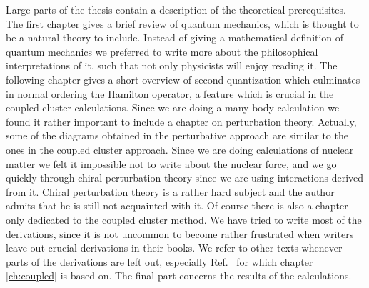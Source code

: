 Large parts  of the thesis contain a description of the theoretical
prerequisites. The first chapter gives a brief review of quantum mechanics, 
which is thought to be a natural theory to include. Instead of giving a mathematical
definition of quantum mechanics we preferred to write more about the
philosophical interpretations of it, such that not only physicists will enjoy
reading it. The following chapter gives a short overview of second
quantization which culminates in normal ordering the Hamilton operator, a feature  which is
crucial in the coupled cluster calculations.  Since we are doing  a many-body
calculation we found it rather important to include a chapter on perturbation
theory. Actually, some of the diagrams obtained in the perturbative approach are
similar to the ones in the coupled cluster approach. Since we are doing calculations
of nuclear matter we felt it impossible not to write about the nuclear force,
and we go quickly through chiral perturbation theory since we are 
using interactions derived from it. Chiral perturbation theory is a rather hard 
subject and the author admits that he is still not acquainted with it. Of course there is also a chapter only dedicated to
the coupled cluster method. We have tried to write most of the derivations, 
since it is not uncommon to become rather frustrated when writers
leave out crucial derivations in their books. We refer to other texts  whenever parts of the derivations are left out, especially 
Ref.~\cite{sjefer} for which chapter \ref{ch:coupled} is based on.  The final part concerns the results of  the calculations.\\
\\
